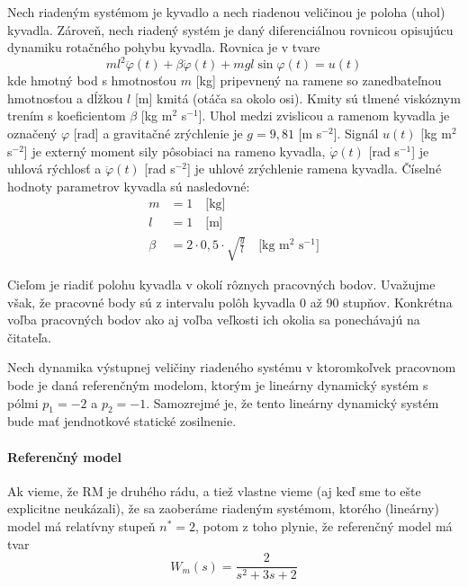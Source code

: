 \documentclass[a4paper, 10pt, ]{article}
\begin{document}
Nech riadeným systémom je kyvadlo a nech riadenou veličinou je poloha (uhol) kyvadla. Zároveň, nech riadený systém je daný diferenciálnou rovnicou opisujúcu dynamiku rotačného pohybu kyvadla. Rovnica je v tvare
\begin{equation} \label{analOpRS}
    ml^2 \ddot{\varphi}(t) + \beta \dot{\varphi}(t) + mgl\sin{\varphi(t)} = u(t)
\end{equation}
kde hmotný bod s hmotnosťou $m$ [kg] pripevnený na ramene so zanedbateľnou hmotnosťou a dĺžkou $l$ [m] kmitá (otáča sa okolo osi). Kmity sú tlmené viskóznym trením s koeficientom $\beta$ [kg m$^2$ s$^{-1}$]. Uhol medzi zvislicou a ramenom kyvadla je označený $\varphi$ [rad] a gravitačné zrýchlenie je $g = 9,81$ [m s$^{-2}$]. Signál $u(t)$ [kg m$^2$ s$^{-2}$] je externý moment sily pôsobiaci na rameno kyvadla, $\dot{\varphi}(t)$ [rad s$^{-1}$] je uhlová rýchlosť a $\ddot{\varphi}(t)$ [rad s$^{-2}$] je uhlové zrýchlenie ramena kyvadla.
Číselné hodnoty parametrov kyvadla sú nasledovné:
\begin{align*}
	m &= 1 \quad \text{[kg]}\\
	l &= 1 \quad \text{[m]}\\
	\beta &= 2 \cdot 0,5 \cdot \sqrt{\frac{g}{l}} \quad \text{[kg m$^2$ s$^{-1}$]}
\end{align*}

Cieľom je riadiť polohu kyvadla v okolí rôznych pracovných bodov. Uvažujme však, že pracovné body sú z intervalu polôh kyvadla 0 až 90 stupňov. Konkrétna voľba pracovných bodov ako aj voľba veľkosti ich okolia sa ponechávajú na čitateľa.

Nech dynamika výstupnej veličiny riadeného systému v ktoromkoľvek pracovnom bode je daná referenčným modelom, ktorým je lineárny dynamický systém s pólmi $p_1 = -2$ a $p_2 = -1$. Samozrejmé je, že tento lineárny dynamický systém bude mať jendnotkové statické zosilnenie.

\paragraph{Referenčný model}

Ak vieme, že RM je druhého rádu, a tiež vlastne vieme (aj keď sme to ešte explicitne neukázali), že sa zaoberáme riadeným systémom, ktorého (lineárny) model má relatívny stupeň $n^* = 2$, potom z toho plynie, že referenčný model má tvar
\begin{equation}
    W_m(s) = \frac{2}{ s^2 + 3 s + 2}
\end{equation}
\end{document}
